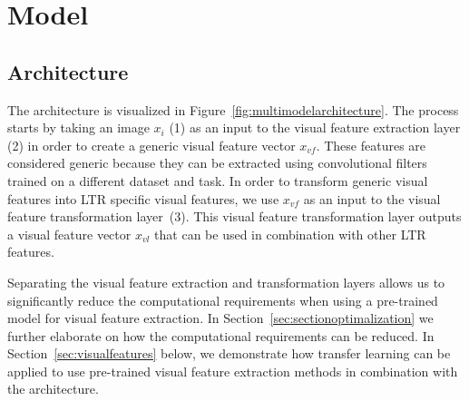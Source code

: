 
\section{\protect\modelname{} Model}

\subsection{Architecture} \label{sec:multimodal}
The \modelname{} architecture is visualized in Figure~\ref{fig:multimodelarchitecture}. 
The process starts by taking an image $x_i$ (1) as an input to the visual feature extraction layer (2) in order to create a generic visual feature vector $x_{vf}$. 
These features are considered generic because they can be extracted using convolutional filters trained on a different dataset and task. 
In order to transform generic visual features into \ac{LTR} specific visual features, we use $x_{vf}$ as an input to the visual feature transformation layer~(3).
This visual feature transformation layer outputs a visual feature vector $x_{vl}$ that can be used in combination with other \ac{LTR} features. 

Separating the visual feature extraction and transformation layers allows us to significantly reduce the computational requirements when using a pre-trained model for visual feature extraction. 
In Section~\ref{sec:sectionoptimalization} we further elaborate on how the computational requirements can be reduced.
In Section~\ref{sec:visualfeatures} below, we demonstrate how transfer learning can be applied to use pre-trained visual feature extraction methods in combination with the \modelname{} architecture.


